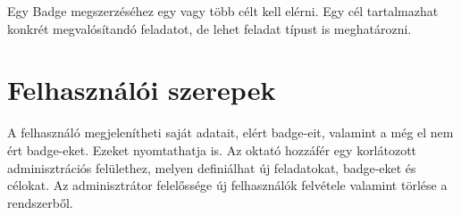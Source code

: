 \documentclass[a4paper,10pt,titlepage]{article}
\begin{document}
Egy Badge megszerzéséhez egy vagy több célt kell elérni. Egy cél tartalmazhat konkrét megvalósítandó feladatot, de lehet feladat típust is meghatározni.

\section{Felhasználói szerepek}
A felhasználó megjelenítheti saját adatait, elért badge-eit, valamint a még el nem ért badge-eket. Ezeket nyomtathatja is.
Az oktató hozzáfér egy korlátozott adminisztrációs felülethez, melyen definiálhat új feladatokat, badge-eket és célokat. 
Az adminisztrátor felelőssége új felhasználók felvétele valamint törlése a rendszerből.
\end{document}
